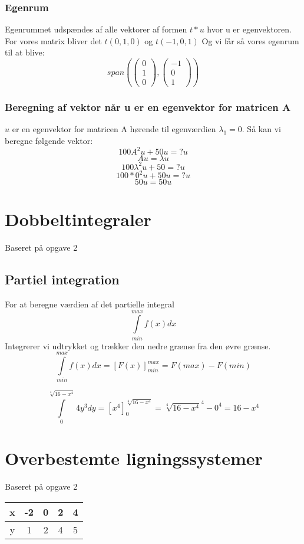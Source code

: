 \documentclass{article}
\begin{document}
\subsubsection{Egenrum}
Egenrummet udspændes af alle vektorer af formen $t*u$ hvor u er egenvektoren.
For vores matrix bliver det $t(0,1,0)$ og $t(-1,0,1)$
Og vi får så vores egenrum til at blive:
$$span(
\begin{pmatrix}0\\1\\0\end{pmatrix},
\begin{pmatrix}-1\\0\\1\end{pmatrix}
)$$

\subsubsection{Beregning af vektor når u er en egenvektor for matricen A}
$u$ er en egenvektor for matricen A hørende til egenværdien $\lambda_1=0$. Så 
kan vi beregne følgende vektor:
$$100A^2u+50u=?u$$
$$Au=\lambda u$$
$$100\lambda^2u+50=?u$$
$$100*0^2u+50u=?u$$
$$50u=50u$$

\newpage

\section{Dobbeltintegraler}
{\tiny Baseret på opgave 2}
\subsection{Partiel integration}
For at beregne værdien af det partielle integral
$$\int\limits_{min}^{max}f(x)dx$$
Integrerer vi udtrykket og trækker den nedre grænse fra den øvre grænse.
$$\int\limits_{min}^{max}f(x)dx = [F(x)]^{max}_{min} = F(max) - F(min)$$

$$\int\limits_{0}^{\sqrt[4]{16-x^4}}4y^3dy = [x^4]^{\sqrt[4]{16-x^4}}_0 = 
\sqrt[4]{16-x^4}^4 - 0^4=16-x^4$$

\newpage

\section{Overbestemte ligningssystemer}
{\tiny Baseret på opgave 2}\\
\begin{center}
\begin{tabular}{c | c | c | c | c}
x & -2 & 0 & 2 & 4\\
\hline
y & 1 & 2 & 4 & 5
\end{tabular}
\end{center}
\end{document}
